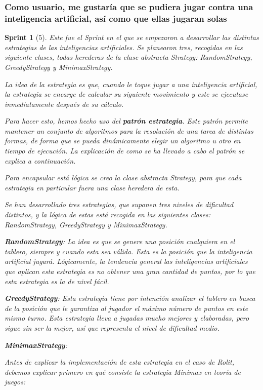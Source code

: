 \documentclass[12pt,a4paper,openright]{book}
\theoremstyle{break}
\newtheorem*{sprint}{Sprint}
\begin{document}
\subsubsection{Como usuario, me gustaría que se pudiera jugar contra una inteligencia artificial, así como que ellas jugaran solas}
\begin{sprint}[5]
Este fue el Sprint en el que se empezaron a desarrollar las distintas estrategias de las inteligencias artificiales. Se planearon tres, recogidas en las siguiente clases, todas herederas de la clase abstracta Strategy: RandomStrategy, GreedyStrategy y MinimaxStrategy.

La idea de la estrategia es que, cuando le toque jugar a una inteligencia artificial, la estrategia se encarge de calcular su siguiente movimiento y este se ejecutase inmediatamente después de su cálculo.

Para hacer esto, hemos hecho uso del \textbf{patrón estrategia}. Este patrón permite mantener un conjunto de algoritmos para la resolución de una tarea de distintas formas, de forma que se pueda dinámicamente elegir un algoritmo u otro en tiempo de ejecución. La explicación de como se ha llevado a cabo el patrón se explica a continuación.

Para encapsular está lógica se creo la clase abstracta Strategy, para que cada estrategia en particular fuera una clase heredera de esta.

Se han desarrollado tres estrategias, que suponen tres niveles de dificultad distintos, y la lógica de estas está recogida en las siguientes clases: RandomStrategy, GreedyStrategy y MinimaxStrategy.

\textbf{RandomStrategy}:
La idea es que se genere una posición cualquiera en el tablero, siempre y cuando esta sea válida. Esta es la posición que la inteligencia artificial jugará.
Lógicamente, la tendencia general las inteligencias artificiales que aplican esta estrategia es no obtener una gran cantidad de puntos, por lo que esta estrategia es la de nivel fácil.

\textbf{GreedyStrategy}:
Esta estrategia tiene por intención analizar el tablero en busca de la posición que le garantiza al jugador el máximo número de puntos en este mismo turno. Esta estrategia lleva a jugadas mucho mejores y elaboradas, pero sigue sin ser la mejor, así que representa el nivel de dificultad medio.

\textbf{MinimaxStrategy}:

Antes de explicar la implementación de esta estrategia en el caso de Rolit, debemos explicar primero en qué consiste la estrategia Minimax en teoría de juegos:


\end{sprint}
\end{document}
